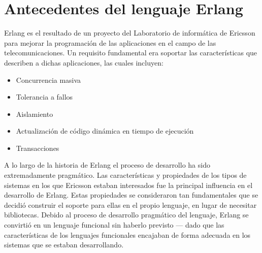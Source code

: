 \chapter{Antecedentes del lenguaje Erlang}
\label{background}

Erlang es el resultado de un proyecto del Laboratorio de inform\'atica de Ericsson para mejorar la programaci\'on 
de las aplicaciones en el campo de las telecomunicaciones. Un requisito fundamental era soportar las caracter\'isticas
que describen a dichas aplicaciones, las cuales incluyen:

\begin{itemize}
\item Concurrencia masiva

\item Tolerancia a fallos

\item Aislamiento

\item Actualizaci\'on de c\'odigo din\'amica en tiempo de ejecuci\'on

\item Transacciones
\end{itemize}

A lo largo de la historia de Erlang el proceso de desarrollo ha sido extremadamente pragm\'atico. Las 
caracter\'isticas y propiedades de los tipos de sistemas en los que Ericsson estaban interesados
fue la principal influencia en el desarrollo de Erlang. Estas propiedades se consideraron tan fundamentales
que se decidi\'o construir el soporte para ellas en el propio lenguaje, en lugar de necesitar bibliotecas.
Debido al proceso de desarrollo pragm\'atico del lenguaje, Erlang se convirti\'o en un lenguaje funcional
sin haberlo previsto --- dado que las caracter\'isticas de los lenguajes funcionales encajaban de forma 
adecuada en los sistemas que se estaban desarrollando.
